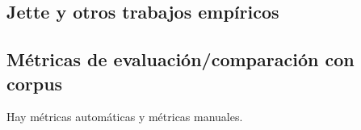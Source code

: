 






\subsection{Jette y otros trabajos emp\'iricos}

\subsection{M\'etricas de evaluaci\'on/comparaci\'on con corpus}

Hay m\'etricas autom\'aticas y m\'etricas manuales.

